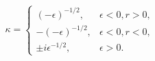 \[\kappa=\begin{cases}(-\epsilon)^{-1/2},&\epsilon<0,r>0,\\
-(-\epsilon)^{-1/2},&\epsilon<0,r<0,\\
\pm i\epsilon^{-1/2},&\epsilon>0.\end{cases}\]